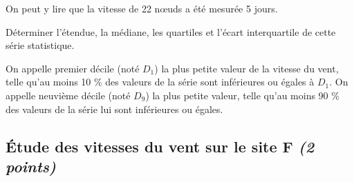 On peut y lire que la vitesse de 22 n\oe uds a été mesurée 5 jours.

\begin{questions}
	\question[3]
	
	
	\question[2] Déterminer l'étendue, la médiane, les quartiles et l'écart interquartile de cette série statistique.
	
	\question[1] On appelle premier décile (noté $D_1$) la plus petite valeur de la vitesse du vent, telle qu'au moins 10 \% des valeurs de la série sont inférieures ou égales à $D_1$. On appelle neuvième décile (noté $D_9$) la plus petite valeur, telle qu'au moins 90 \% des valeurs de la série lui sont inférieures ou égales.
	
\end{questions}

\subsection{\'Etude des vitesses du vent sur le site F \textit{(2 points)}}\label{part:site_F}

